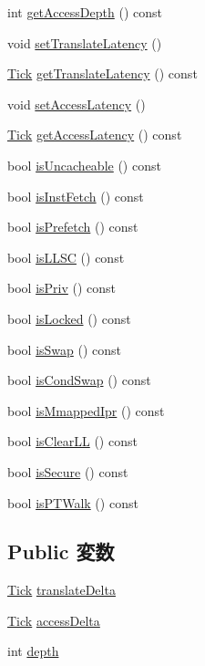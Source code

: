 \begin{DoxyCompactItemize}
\item 
int \hyperlink{classRequest_a70caa016418f07187ca33babab978614}{getAccessDepth} () const 
\item 
void \hyperlink{classRequest_a619cef7b12397043980f12337b06492c}{setTranslateLatency} ()
\item 
\hyperlink{base_2types_8hh_a5c8ed81b7d238c9083e1037ba6d61643}{Tick} \hyperlink{classRequest_a03c6d5bbbf5443f44d5e66420ab8eb19}{getTranslateLatency} () const 
\item 
void \hyperlink{classRequest_ae10871c545a9288b0b1cf05f43d49e19}{setAccessLatency} ()
\item 
\hyperlink{base_2types_8hh_a5c8ed81b7d238c9083e1037ba6d61643}{Tick} \hyperlink{classRequest_af726194e22b49588e1c087bc810f11cc}{getAccessLatency} () const 
\item 
bool \hyperlink{classRequest_a70c74b2809417ea8701dd6ba9e34312d}{isUncacheable} () const 
\item 
bool \hyperlink{classRequest_ae742b8e8aaa2e18506dc64c7b7f3fc0a}{isInstFetch} () const 
\item 
bool \hyperlink{classRequest_a1eef1bb814a1f77346aba1648fb6d1c9}{isPrefetch} () const 
\item 
bool \hyperlink{classRequest_a8965874e960faf91ad4b6af8dbf31875}{isLLSC} () const 
\item 
bool \hyperlink{classRequest_ab2f3b2dabbe343b396cfbb7b3a0d726b}{isPriv} () const 
\item 
bool \hyperlink{classRequest_ae0c9fa9daf2467984aea571a0f3940c6}{isLocked} () const 
\item 
bool \hyperlink{classRequest_a6ec455c5a36403d3a8319bcfbf356bc1}{isSwap} () const 
\item 
bool \hyperlink{classRequest_a086ef1e55d60089d0aa0232ff797eaef}{isCondSwap} () const 
\item 
bool \hyperlink{classRequest_aad621c262e009350dd86ad5715c50f7a}{isMmappedIpr} () const 
\item 
bool \hyperlink{classRequest_ab212f26b531d63897c5458251027c37e}{isClearLL} () const 
\item 
bool \hyperlink{classRequest_a3110ebf17828782ae5aeced7396cfff2}{isSecure} () const 
\item 
bool \hyperlink{classRequest_ad381099a042382bff9eadb1ea6f1a2e1}{isPTWalk} () const 
\end{DoxyCompactItemize}
\subsection*{Public 変数}
\begin{DoxyCompactItemize}
\item 
\hyperlink{base_2types_8hh_a5c8ed81b7d238c9083e1037ba6d61643}{Tick} \hyperlink{classRequest_ab7388562dc4c01194509c8eef5084684}{translateDelta}
\item 
\hyperlink{base_2types_8hh_a5c8ed81b7d238c9083e1037ba6d61643}{Tick} \hyperlink{classRequest_aa559a89e151ecba54621f0360fa1e6a3}{accessDelta}
\item 
int \hyperlink{classRequest_acb5ba97551079e0b072c62c21d784ac5}{depth}
\end{DoxyCompactItemize}
